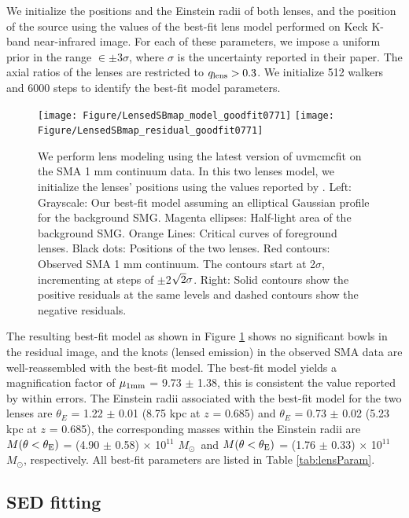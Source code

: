 \documentclass[twocolumn,apj,numberedappendix]{emulateapj}
\newcommand{\Msun}{\mbox{$M_{\odot}$}}
\begin{document}
We initialize the positions and the Einstein radii of both lenses, and the position of the source using the
values of the best-fit lens model \citet{Haas14} performed on Keck K-band near-infrared image. For each of
these parameters, we impose a uniform prior in the range $\in\pm$3$\sigma$, where $\sigma$ is the uncertainty
reported in their paper. The axial ratios of the lenses are restricted to $q_{\rm lens} > 0.3$. We initialize 512
walkers and 6000 steps to identify the best-fit model parameters.
\begin{figure}[!tbpH]
\centering
\texttt{[image: Figure/LensedSBmap\_model\_goodfit0771]}
\texttt{[image: Figure/LensedSBmap\_residual\_goodfit0771]}
\caption{We perform lens modeling using the latest version of {\sc uvmcmcfit} on the SMA 1 mm continuum data.
In this two lenses model, we initialize the lenses' positions using the values reported by \citet{Haas14}. Left:
Grayscale: Our best-fit model assuming an elliptical Gaussian profile for the background SMG. Magenta ellipses:
Half-light area of the background SMG. Orange Lines: Critical curves of foreground lenses. Black dots: Positions of
the two lenses. Red contours: Observed SMA 1 mm continuum. The contours start at 2$\sigma$, incrementing at
steps of $\pm$2$\sqrt{\rm 2}\sigma$. Right: Solid contours show the positive residuals at the same levels and dashed contours
show the negative residuals. \label{fig:lens}}
\end{figure}

The resulting best-fit model as shown in Figure \ref{fig:lens} shows no significant bowls in the residual
image, and the knots (lensed emission) in the observed SMA data are well-reassembled with the best-fit model.
The best-fit model yields a magnification
factor of $\mu_{\rm 1mm}$ = 9.73 $\pm$ 1.38, this is consistent the value reported by \citet{Haas14} within errors. The Einstein radii associated with the best-fit model for the two lenses are $\theta_{E}$ =
1.22 $\pm$ 0.01 (8.75 kpc at $z$ = 0.685) and $\theta_{E}$ = 0.73 $\pm$ 0.02 (5.23 kpc at $z$ = 0.685),
the corresponding masses within the Einstein radii are $M(\theta < \theta_{\rm E})$ = (4.90 $\pm$ 0.58) $\times$ 10$^{11}$ 
\Msun\ 
and $M(\theta < \theta_{\rm E})$ = (1.76 $\pm$ 0.33) $\times$ 10$^{11}$ \Msun, respectively. All best-fit
parameters are listed in Table \ref{tab:lensParam}.


\subsection{SED fitting} \label{sec:SED}
\end{document}
